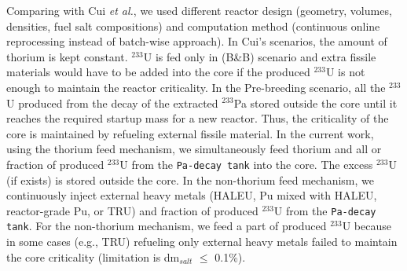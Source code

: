\documentclass[answers,11pt]{exam}
\begin{document}
\begin{questions}
\begin{solution}
                Comparing with Cui \emph{et al.}, we used different reactor 
                design (geometry, 
                volumes, densities, fuel salt compositions) and computation 
                method (continuous 
                online reprocessing instead of batch-wise approach). In Cui's 
                scenarios, the 
                amount of thorium is kept constant. $^{233}$U is fed only in 
                (B\&B) scenario 
                and extra fissile materials would have to be added into the 
                core if the 
                produced $^{233}$U is not enough to maintain the reactor 
                criticality. In the 
                Pre-breeding scenario, all the $^{233}$U produced from the 
                decay of the 
                extracted $^{233}$Pa stored outside the core until it reaches 
                the required 
                startup mass for a new reactor. Thus, the criticality of the 
                core is 
                maintained by refueling external fissile material. In the 
                current work, using 
                the thorium feed mechanism, we simultaneously feed thorium and 
                all or fraction 
                of produced $^{233}$U from the \texttt{Pa-decay tank} into the 
                core. The 
                excess $^{233}$U (if exists) is stored outside the core. In 
                the non-thorium 
                feed mechanism, we continuously inject external heavy metals 
                (HALEU, Pu mixed 
                with HALEU, reactor-grade Pu, or TRU) and fraction of produced 
                $^{233}$U from 
                the \texttt{Pa-decay tank}. For the non-thorium mechanism, we 
                feed a part of 
                produced $^{233}$U because in some cases (e.g., TRU) refueling 
                only external 
                heavy metals failed to maintain the core criticality 
                (limitation is 
                dm$_{salt}$ $\leq$ 0.1\%). 
                
        \end{solution}

        


\end{questions}
\end{document}
